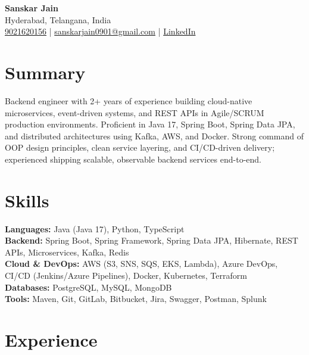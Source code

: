\documentclass[a4paper,10pt]{article}
\begin{document}
\begin{center}
    {\LARGE \textbf{Sanskar Jain}} \\
    Hyderabad, Telangana, India \\
    \href{tel:9021620156}{9021620156} \;|\;
    \href{mailto:sanskarjain0901@gmail.com}{sanskarjain0901@gmail.com} \;|\;
    \href{https://www.linkedin.com/in/sanskar-jain0901/}{LinkedIn}
\end{center}

\vspace{3pt}

\section*{Summary}
Backend engineer with 2+ years of experience building cloud-native microservices, event-driven systems, and REST APIs in Agile/SCRUM production environments.
Proficient in Java 17, Spring Boot, Spring Data JPA, and distributed architectures using Kafka, AWS, and Docker.
Strong command of OOP design principles, clean service layering, and CI/CD-driven delivery; experienced shipping scalable, observable backend services end-to-end.

\section*{Skills}
\textbf{Languages:} Java (Java 17), Python, TypeScript \\
\textbf{Backend:} Spring Boot, Spring Framework, Spring Data JPA, Hibernate, REST APIs, Microservices, Kafka, Redis \\
\textbf{Cloud \& DevOps:} AWS (S3, SNS, SQS, EKS, Lambda), Azure DevOps, CI/CD (Jenkins/Azure Pipelines), Docker, Kubernetes, Terraform \\
\textbf{Databases:} PostgreSQL, MySQL, MongoDB \\
\textbf{Tools:} Maven, Git, GitLab, Bitbucket, Jira, Swagger, Postman, Splunk

\section*{Experience}
\end{document}
